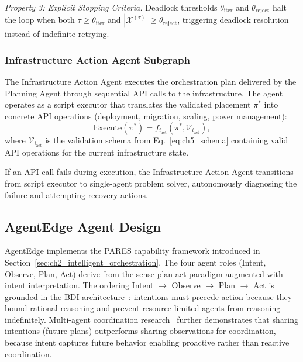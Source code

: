 \textit{Property 3: Explicit Stopping Criteria.} Deadlock thresholds $\theta_{\text{iter}}$ and $\theta_{\text{reject}}$ halt the loop when both $\tau \geq \theta_{\text{iter}}$ and $|\mathcal{X}^{(\tau)}| \geq \theta_{\text{reject}}$, triggering deadlock resolution instead of indefinite retrying.

\subsubsection{Infrastructure Action Agent Subgraph}

The Infrastructure Action Agent executes the orchestration plan delivered by the Planning Agent through sequential \ac{API} calls to the infrastructure. The agent operates as a script executor that translates the validated placement $\pi^*$ into concrete \ac{API} operations (deployment, migration, scaling, power management):
\begin{equation}
\text{Execute}(\pi^*) = f_{i_{\text{act}}}(\pi^*, \mathcal{V}_{i_{\text{act}}}),
\label{eq:ch5_act_agent}
\end{equation}
where $\mathcal{V}_{i_{\text{act}}}$ is the validation schema from Eq.~\ref{eq:ch5_schema} containing valid \ac{API} operations for the current infrastructure state.

If an \ac{API} call fails during execution, the Infrastructure Action Agent transitions from script executor to single-agent problem solver, autonomously diagnosing the failure and attempting recovery actions.

\subsection{AgentEdge Agent Design}
\label{subsec:ch5_pares}

\ac{AgentEdge} implements the \ac{PARES} capability framework introduced in Section~\ref{sec:ch2_intelligent_orchestration}. The four agent roles (Intent, Observe, Plan, Act) derive from the sense-plan-act paradigm augmented with intent interpretation. The ordering Intent $\to$ Observe $\to$ Plan $\to$ Act is grounded in the \ac{BDI} architecture~\cite{georgeff1991modeling}: intentions must precede action because they bound rational reasoning and prevent resource-limited agents from reasoning indefinitely. Multi-agent coordination research~\cite{kim2021communication} further demonstrates that sharing intentions (future plans) outperforms sharing observations for coordination, because intent captures future behavior enabling proactive rather than reactive coordination.

